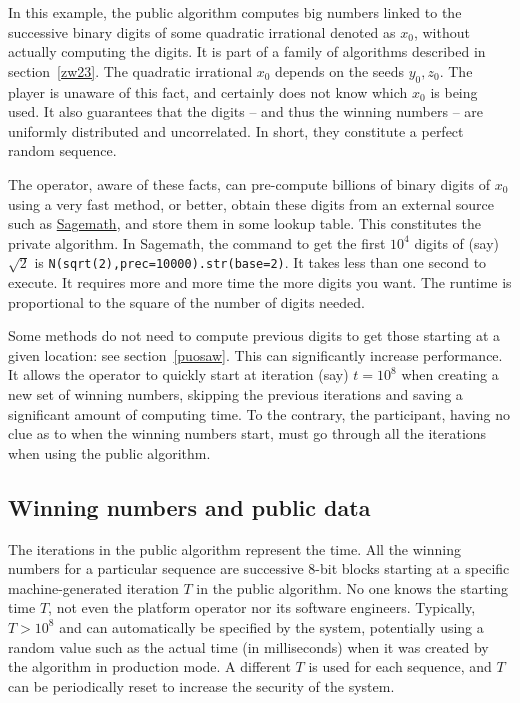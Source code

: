 \documentclass[oneside,10pt]{book}
\begin{document}
In this example, the public algorithm computes big numbers linked to the successive binary digits of some quadratic irrational denoted as $x_0$,
 without actually computing the digits. It is part of a family of algorithms described in section~\ref{zw23}.
The quadratic irrational $x_0$ depends on the seeds $y_0, z_0$.
The player is unaware of this fact, and certainly does not know which $x_0$ is being used. It also guarantees that the digits -- and thus the winning numbers -- are uniformly distributed and uncorrelated. In short, they constitute a perfect random sequence. 

The operator, aware of these facts, can pre-compute billions of binary digits of $x_0$ using a very fast method, or better,
 obtain these digits from an external source such as \href{https://sagecell.sagemath.org/}{Sagemath}, and store them in some lookup table. This constitutes the private algorithm. 
In Sagemath, the command to get the first $10^4$ digits of (say) $\sqrt{2}$ is 
\texttt{N(sqrt(2),prec=10000).str(base=2)}. It takes less than one second to execute. It requires more and more time the more digits you want. The
 runtime is proportional to the square of the number of digits needed.  

Some methods do not need to compute previous digits to get those starting at a given location: see section~\ref{puosaw}. This can significantly increase performance. It allows the operator to quickly start at iteration (say) $t=10^8$ when creating a new set of winning numbers, skipping the previous iterations and saving a significant amount of computing time. To the contrary, the participant, having no clue as to when the winning numbers start, must go through all the iterations when using the public algorithm.



\subsection{Winning numbers and public data}\label{bvp0z1}

The iterations in the public algorithm  represent the time. 
All the winning numbers for a particular sequence are successive 8-bit blocks starting at a specific machine-generated iteration $T$ in the public algorithm.
No one knows the starting time $T$, not even the platform operator nor its software engineers. Typically, $T > 10^8$ and can automatically be specified
 by the system,  potentially using a random value such as the actual time (in milliseconds) when it was created by the algorithm in production mode. A different $T$ is used for each sequence, and $T$ can be periodically reset to increase the security of the system.
\end{document}
